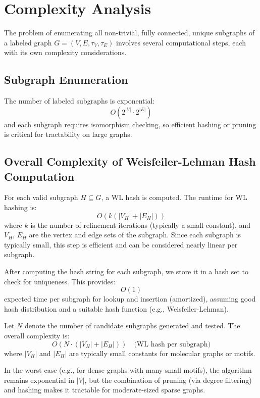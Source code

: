 \documentclass{article}
\begin{document}
\section*{Complexity Analysis}

The problem of enumerating all non-trivial, fully connected, unique subgraphs of a labeled graph \( G = (V, E, \tau_V, \tau_E) \) involves several computational steps, each with its own complexity considerations.

\subsection*{Subgraph Enumeration}


The number of labeled subgraphs is exponential:
\[
O(2^{|V|} \cdot 2^{|E|})
\]
and each subgraph requires isomorphism checking, so efficient hashing or pruning is critical for tractability on large graphs.


\subsection*{Overall Complexity of Weisfeiler-Lehman Hash Computation}

For each valid subgraph \( H \subseteq G \), a WL hash is computed. The runtime for WL hashing is:
\[
O(k(|V_H| + |E_H|))
\]
where \( k \) is the number of refinement iterations (typically a small constant), and \( V_H \), \( E_H \) are the vertex and edge sets of the subgraph. Since each subgraph is typically small, this step is efficient and can be considered nearly linear per subgraph.

After computing the hash string for each subgraph, we store it in a hash set to check for uniqueness. This provides:
\[
O(1)
\]
expected time per subgraph for lookup and insertion (amortized), assuming good hash distribution and a suitable hash function (e.g., Weisfeiler-Lehman).

Let \( N \) denote the number of candidate subgraphs generated and tested. The overall complexity is:
\[
O(N \cdot (|V_H| + |E_H|)) \quad \text{(WL hash per subgraph)}
\]
where \( |V_H| \) and \( |E_H| \) are typically small constants for molecular graphs or motifs.

In the worst case (e.g., for dense graphs with many small motifs), the algorithm remains exponential in \( |V| \), but the combination of pruning (via degree filtering) and hashing makes it tractable for moderate-sized sparse graphs.
\end{document}

